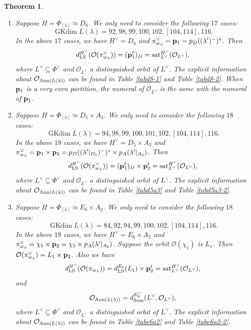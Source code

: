 \documentclass[reqno,12pt]{amsart}
\numberwithin{equation}{section}
\theoremstyle{plain}
\newtheorem{Thm}{Theorem}[section]
\theoremstyle{definition}
\newcommand{\lam}{\lambda}
\renewcommand{\subset}{\subseteq}
\newcommand{\gkd}{\operatorname{GKdim}}
\begin{document}
\begin{Thm}
\begin{enumerate}
\item Suppose $H=\Phi_{[\lam]}\simeq D_8$. 
We only need to consider the following $17$ cases:
$$\gkd L(\lam)=92,98,99,100,102,[104,114],116.$$
In the above $17$ cases, we have $H^{\vee}=D_8$ and   
$\pi^{\vee}_{w_{\lam}}={\bf p}_{1}=p_{D}((\lam')^-)^s$. Then $$d_{\rm LS}^{H^\vee} (\mathcal{O}(\pi_{w_{\lam}}^\vee))=({\bf p}_{1}^t)_D  = {\rm sat}_{L^\vee}^{H^\vee} (\mathcal{O}_{L^\vee}),$$
where $L^\vee \subset \Phi^\vee$ and $\mathcal{O}_{L^\vee}$ a distinguished orbit of $L^\vee$. The explicit information about $\mathcal{O}_{{\rm Ann}(L(\lambda))}$ can be found in Table \ref{tabd8-1} and Table \ref{tabd8-2}. When ${\bf p}_{1}$ is a very even partition, the numeral of $\mathcal{O}_{L^{\vee}}$ is the same with the numeral of ${\bf p}_{1}$.



\item Suppose $H=\Phi_{[\lam]}\simeq D_5\times A_3$. 
We only need to consider the following $18$ cases:
$$\gkd L(\lam)=94,98,99,100,101,102,[104,114],116.$$
In the above $18$ cases, we have $H^{\vee}=D_5\times A_3$ and   
$\pi^{\vee}_{w_{\lam}}={\bf p}_{1}\times {\bf p}_{2}=p_{D}((\lam'|_{D_5})^-)^s\times p_{A}(\lam'|_{A_3})$. Then $$d_{\rm LS}^{H^\vee} (\mathcal{O}(\pi_{w_{\lam}}^\vee))=({\bf p}_{1}^t)_D\times {\bf p}^t_{2} = {\rm sat}_{L^\vee}^{H^\vee} (\mathcal{O}_{L^\vee}),$$
where $L^\vee \subset \Phi^\vee$ and $\mathcal{O}_{L^\vee}$ a distinguished orbit of $L^\vee$. The explicit information about $\mathcal{O}_{{\rm Ann}(L(\lambda))}$ can be found in Table \ref{tabd5a3} and Table \ref{tabd5a3-2}. 


\item Suppose $H=\Phi_{[\lam]}\simeq E_6\times A_2$. We only need to consider the following $18$ cases:
$$\gkd L(\lam)=84,92,94,99,100,102,[104,114],116.$$
In the above $18$ cases, we have $H^{\vee}=E_6\times A_2$ and
$\pi^{\vee}_{w_{\lam}}={\chi}_{1}\times {\bf p}_{2}={\chi}_{1}\times p_{A}(\lam'|_{A_2})$. 
Suppose the orbit $\mathcal{O}({\chi}_{1})$ is $L_{1}$. Then $\mathcal{O}(\pi_{w_\lambda}^\vee)=L_{1}\times {\bf p}_{2}$. 
Also we have
$$d_{\rm LS}^{H^\vee}(\mathcal{O}(\pi_{w_\lambda})) =d_{\rm LS}^{E_6}(L_1)\times {\bf p}^t_{2}= {\rm sat}_{L^\vee}^{H^\vee}(\mathcal{O}_{L^\vee}),$$
and $$\mathcal{O}_{{\rm Ann}(L(\lambda))} = d_{\rm Som}^{E_8^\vee}(L^{\vee}, \mathcal{O}_{L^\vee}),$$
where $L^\vee \subset \Phi^\vee$ and $\mathcal{O}_{L^\vee}$ a distinguished orbit of $L^\vee$. The explicit information about $\mathcal{O}_{{\rm Ann}(L(\lambda))}$ can be found in Table \ref{tabe6a2} and Table \ref{tabe6a2-2}.



\end{enumerate}
\end{Thm}
\end{document}
